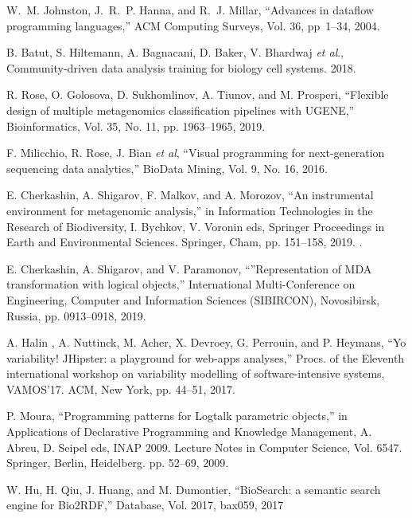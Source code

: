 \documentclass[a4paper]{jpconf}
\begin{document}
\begin{thebibliography}{00}
 W.~M. Johnston, J.~R.~P. Hanna, and R.~J. Millar, ``Advances in dataflow programming languages,'' ACM Computing Surveys, Vol. 36, pp~1--34, 2004. 

 B. Batut, S. Hiltemann, A. Bagnacani, D. Baker, V. Bhardwaj \emph{et al}., Community-driven data analysis training for biology cell systems. 2018. 

  R. Rose, O. Golosova, D. Sukhomlinov, A. Tiunov, and M. Prosperi, ``Flexible design of multiple metagenomics classification pipelines with UGENE,'' Bioinformatics, Vol. 35, No. 11, pp. 1963--1965, 2019. 

 F. Milicchio, R. Rose, J. Bian \emph{et al}, ``Visual programming for next-generation sequencing data analytics,'' BioData Mining, Vol. 9, No. 16, 2016. 

 E. Cherkashin, A. Shigarov, F. Malkov, and A. Morozov, ``An instrumental environment for metagenomic analysis,'' in Information Technologies in the Research of Biodiversity, I. Bychkov, V. Voronin eds, Springer Proceedings in Earth and Environmental Sciences. Springer, Cham, pp. 151--158, 2019. .

  E. Cherkashin, A. Shigarov, and V. Paramonov, ``''Representation of MDA transformation with logical objects,'' International Multi-Conference on Engineering, Computer and Information Sciences (SIBIRCON), Novosibirsk, Russia, pp. 0913--0918, 2019. 

 A. Halin , A. Nuttinck, M. Acher, X. Devroey, G. Perrouin, and P. Heymans, ``Yo variability! JHipster: a playground for web-apps analyses,'' Procs. of the Eleventh international workshop on variability modelling of software-intensive systems, VAMOS’17. ACM, New York, pp. 44–51, 2017. 

 P. Moura, ``Programming patterns for Logtalk parametric objects,'' in Applications of Declarative Programming and Knowledge Management, A. Abreu, D. Seipel eds, INAP 2009. Lecture Notes in Computer Science, Vol. 6547. Springer, Berlin, Heidelberg. pp. 52--69, 2009. 

 W. Hu, H. Qiu, J. Huang, and M. Dumontier, ``BioSearch: a semantic search engine for Bio2RDF,'' Database, Vol. 2017, bax059, 2017 














\end{thebibliography}
\end{document}
